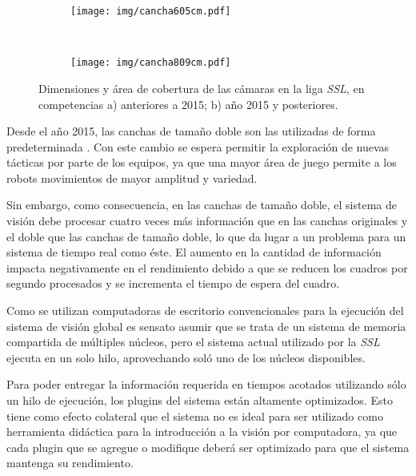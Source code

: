 \begin{figure}[h]

	\centering

	\begin{subfigure}[c]{0.45\textwidth}
		\centering
		\texttt{[image: img/cancha605cm.pdf]}
		\caption{}
	\end{subfigure}
	~
	\begin{subfigure}[c]{0.45\textwidth}
		\centering
		\texttt{[image: img/cancha809cm.pdf]}
		\caption{}
	\end{subfigure}

	\caption{Dimensiones y área de cobertura de las cámaras en la liga
	\emph{SSL}, en competencias a) anteriores a 2015; b) año 2015 y
	posteriores.}

	\label{cancha}

\end{figure}

Desde el año 2015, las canchas de tamaño doble son las utilizadas de forma
predeterminada \cite{sslrules2015}. Con este cambio se espera permitir la
exploración de nuevas tácticas por parte de los equipos, ya que una mayor área
de juego permite a los robots movimientos de mayor amplitud y variedad.

Sin embargo, como consecuencia, en las canchas de tamaño doble, el sistema de
visión debe procesar cuatro veces más información que en las canchas
originales y el doble que las canchas de tamaño doble, lo que da lugar a un
problema para un sistema de tiempo real como éste. El aumento en la cantidad
de información impacta negativamente en el rendimiento debido a que se reducen
los cuadros por segundo procesados y se incrementa el tiempo de espera del
cuadro.

Como se utilizan computadoras de escritorio convencionales para la ejecución
del sistema de visión global es sensato asumir que se trata de un sistema de
memoria compartida de múltiples núcleos, pero el sistema actual utilizado por la
\emph{SSL} ejecuta en un solo hilo, aprovechando soló uno de los núcleos
disponibles.

Para poder entregar la información requerida en tiempos acotados utilizando sólo
un hilo de ejecución, los plugins del sistema están altamente optimizados. Esto
tiene como efecto colateral que el sistema no es ideal para ser utilizado como
herramienta didáctica para la introducción a la visión por computadora, ya que
cada plugin que se agregue o modifique deberá ser optimizado para que el sistema
mantenga su rendimiento.
